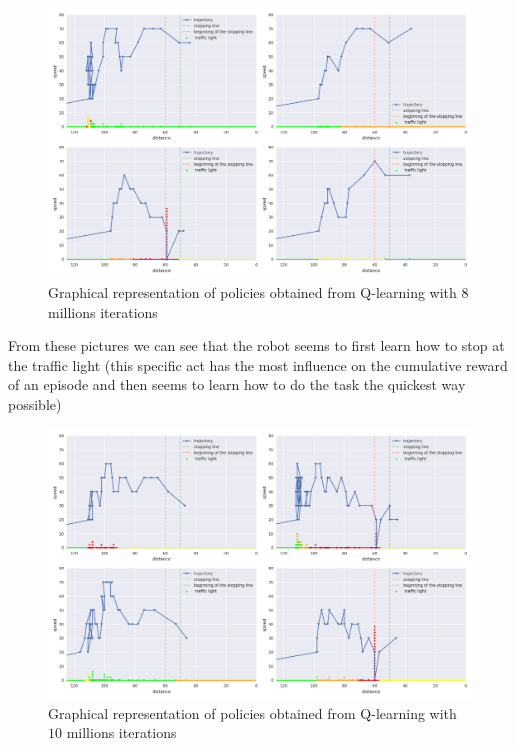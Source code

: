 \documentclass[14pt,a4paper]{article}
\theoremstyle{definition}
\begin{document}
\begin{figure}[H]
\centering
\includegraphics[scale=0.4]{img/traj8m.png}
\caption{Graphical representation of  policies obtained from Q-learning with $8$ millions  iterations}
\end{figure}

From these pictures we can see that the robot seems to first learn how to stop at the traffic light (this specific act has the most influence on the cumulative reward of an episode and then seems to learn how to do the task the quickest way possible) 

\begin{figure}[H]
\centering
\includegraphics[scale=0.4]{img/traj_not_smooth_10m.png}
\caption{Graphical representation of  policies obtained from Q-learning with $10$ millions  iterations}
\label{non_smooth}
\end{figure}

\newpage
\end{document}
